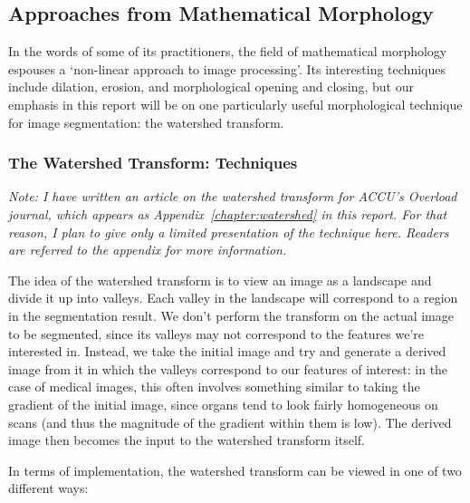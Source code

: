\subsection{Approaches from Mathematical Morphology}

In the words of some of its practitioners\footnotemark{}, the field of mathematical morphology espouses a `non-linear approach to image processing'. Its interesting techniques include dilation, erosion, and morphological opening and closing, but our emphasis in this report will be on one particularly useful morphological technique for image segmentation: the watershed transform.


\subsubsection*{The Watershed Transform: Techniques}


\emph{Note: I have written an article on the watershed transform for ACCU's Overload journal, which appears as Appendix~\ref{chapter:watershed} in this report. For that reason, I plan to give only a limited presentation of the technique here. Readers are referred to the appendix for more information.}

The idea of the watershed transform is to view an image as a landscape and divide it up into valleys. Each valley in the landscape will correspond to a region in the segmentation result. We don't perform the transform on the actual image to be segmented, since its valleys may not correspond to the features we're interested in. Instead, we take the initial image and try and generate a derived image from it in which the valleys correspond to our features of interest: in the case of medical images, this often involves something similar to taking the gradient of the initial image, since organs tend to look fairly homogeneous on scans (and thus the magnitude of the gradient within them is low). The derived image then becomes the input to the watershed transform itself.

In terms of implementation, the watershed transform can be viewed in one of two different ways:

